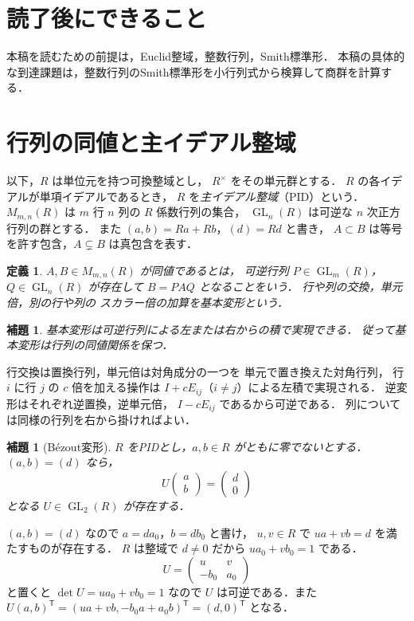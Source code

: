 \documentclass[a5paper,10pt,onecolumn]{jsarticle}
\makeatletter
\theoremstyle{mathnotetheorem}
\newtheorem{definition}[theorem]{定義}
\newtheorem{lemma}[theorem]{補題}
\renewcommand{\proofname}{証明}
\renewenvironment{proof}[1][\proofname]{%
  \par\pushQED{\qed}\normalfont\topsep4\p@\@plus2\p@\relax
  \trivlist\item[\hskip\labelsep\bfseries #1]\ignorespaces
}{\popQED\endtrivlist\@endpefalse}
\makeatother
\begin{document}
\section*{読了後にできること}
本稿を読むための前提は，Euclid整域，整数行列，Smith標準形．
本稿の具体的な到達課題は，整数行列のSmith標準形を小行列式から検算して商群を計算する．

\section{行列の同値と主イデアル整域}

以下，$R$ は単位元を持つ可換整域とし，
$R^\times$ をその単元群とする．
$R$ の各イデアルが単項イデアルであるとき，
$R$ を\emph{主イデアル整域}（PID）という．
$M_{m,n}(R)$ は $m$ 行 $n$ 列の $R$ 係数行列の集合，
$\operatorname{GL}_n(R)$ は可逆な $n$ 次正方行列の群とする．
また $(a,b)=Ra+Rb$，$(d)=Rd$ と書き，
$A\subset B$ は等号を許す包含，$A\subsetneq B$ は真包含を表す．

\begin{definition}
$A,B\in M_{m,n}(R)$ が\emph{同値}であるとは，
可逆行列 $P\in\operatorname{GL}_m(R)$，
$Q\in\operatorname{GL}_n(R)$ が存在して
$B=PAQ$ となることをいう．
行や列の交換，単元倍，別の行や列の
スカラー倍の加算を\emph{基本変形}という．
\end{definition}

\begin{lemma}\label{lem:elementary}
基本変形は可逆行列による左または右からの積で実現できる．
従って基本変形は行列の同値関係を保つ．
\end{lemma}
\begin{proof}
行交換は置換行列，単元倍は対角成分の一つを
単元で置き換えた対角行列，
行 $i$ に行 $j$ の $c$ 倍を加える操作は
$I+cE_{ij}$（$i\ne j$）による左積で実現される．
逆変形はそれぞれ逆置換，逆単元倍，
$I-cE_{ij}$ であるから可逆である．
列については同様の行列を右から掛ければよい．
\end{proof}

\begin{lemma}[B\'ezout変形]\label{lem:bezout}
$R$ をPIDとし，$a,b\in R$ がともに零でないとする．
$(a,b)=(d)$ なら，
\[
 U\begin{pmatrix}a\\b\end{pmatrix}
 =\begin{pmatrix}d\\0\end{pmatrix}
\]
となる $U\in\operatorname{GL}_2(R)$ が存在する．
\end{lemma}
\begin{proof}
$(a,b)=(d)$ なので
$a=da_0$，$b=db_0$ と書け，
$u,v\in R$ で $ua+vb=d$ を満たすものが存在する．
$R$ は整域で $d\ne0$ だから
$ua_0+vb_0=1$ である．
\[
 U=\begin{pmatrix}u&v\\-b_0&a_0\end{pmatrix}
\]
と置くと
$\det U=ua_0+vb_0=1$ なので
$U$ は可逆である．また
$U(a,b)^{\mathsf T}=(ua+vb,-b_0a+a_0b)^{\mathsf T}
=(d,0)^{\mathsf T}$ となる．
\end{proof}
\end{document}
